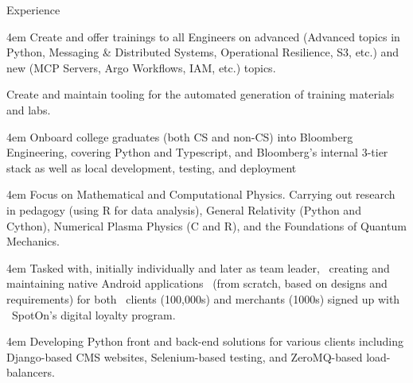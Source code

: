 \begin{Section}{Experience}

	\begin{nbList}
		\item {}

			\begin{adjustwidth}{4em}{}
				Create and offer trainings to all Engineers on advanced (Advanced topics in Python, Messaging \& Distributed Systems, Operational Resilience, S3, etc.) and new (MCP Servers, Argo Workflows, IAM, etc.) topics.

				Create and maintain tooling for the automated generation of training materials and labs.
			\end{adjustwidth}

		\item {}

			\begin{adjustwidth}{4em}{}
				Onboard college graduates (both CS and non-CS) into Bloomberg Engineering, covering Python and Typescript,
				and Bloomberg's internal 3-tier stack as well as local development, testing, and deployment
			\end{adjustwidth}

		\item {}

			\begin{adjustwidth}{4em}{}
				Focus on Mathematical and Computational Physics. Carrying out research in pedagogy (using R for data analysis), General Relativity (Python and Cython), Numerical Plasma Physics (C and R), and the Foundations of Quantum Mechanics.
			\end{adjustwidth}

		\item {}

			\begin{adjustwidth}{4em}{}
				Tasked with, initially individually and later as team leader, \
				creating and maintaining native Android applications \
				(from scratch, based on designs and requirements) for both \
				clients (100,000s) and merchants (1000s) signed up with \
				SpotOn's digital loyalty program.
			\end{adjustwidth}

		\item {}

			\begin{adjustwidth}{4em}{}
				Developing Python front and back-end solutions for various clients including Django-based CMS websites, Selenium-based testing, and ZeroMQ-based load-balancers.
			\end{adjustwidth}

	\end{nbList}

\end{Section}


